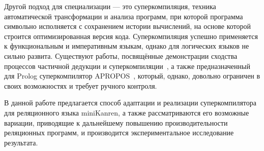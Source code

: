 Другой подход для специализации --- это суперкомпиляция, 
техника автоматической трансформации и анализа программ,
при которой программа символьно исполняется с сохранением истории вычислений,
на основе которой строится оптимизированная версия кода.
Суперкомпиляция успешно применяется к функциональным и императивным языкам,
однако для логических языков не сильно развита. Существуют
работы, посвящённые демонстрации сходства процессов частичной дедукции и суперкомпиляции~\cite{pdAndDriving},
а также предназначенный для Prolog суперкомпилятор APROPOS~\cite{apropos}, который, однако, довольно ограничен
в своих возможностях и требует ручного контроля.

В данной работе предлагается способ адаптации и реализации суперкомпилятора для
реляционного языка miniKanren, а также рассматриваются его возможные вариации, приводящие к
дальнейшему повышению производительности реляционных программ, и производится экспериментальное
исследование результата.
